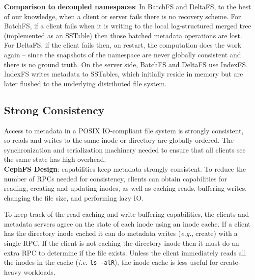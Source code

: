 \noindent\textbf{Comparison to decoupled namespaces}: In BatchFS and DeltaFS,
to the best of our knowledge, when a client or server fails there is no recovery
scheme. For BatchFS, if a client fails when it is writing to the local
log-structured merged tree (implemented as an SSTable) then those batched
metadata operations are lost. For DeltaFS, if the client fails then, on restart,
the computation does the work again -- since the snapshots of the namespace are
never globally consistent and there is no ground truth.  On the server side,
BatchFS and DeltaFS use IndexFS. IndexFS writes metadata to SSTables, which
initially reside in memory but are later flushed to the underlying
distributed file system.

\subsection{Strong Consistency}
\label{sec:strong-consistency}

Access to metadata in a POSIX IO-compliant file system is strongly consistent, so
reads and writes to the same inode or directory are globally ordered.  The
synchronization and serialization machinery needed to ensure that all clients
see the same state has high overhead.\\

\noindent\textbf{CephFS Design}: capabilities keep metadata strongly
consistent. To reduce the number of RPCs needed for consistency, clients can
obtain capabilities for reading, creating and updating inodes, as well as caching reads,
buffering writes, changing the file size, and performing lazy IO.

To keep track of the read caching and write buffering capabilities, the clients
and metadata servers agree on the state of each inode using an inode cache.  If
a client has the directory inode cached it can do metadata writes ({\it e.g.},
create) with a single RPC. If the client is not caching the directory inode
then it must do an extra RPC to determine if the file exists.  Unless the
client immediately reads all the inodes in the cache ({\it i.e.} \texttt{ls
-alR}), the inode cache is less useful for create-heavy workloads.


